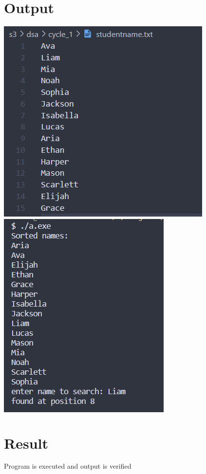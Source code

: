 \section{Output}
\includegraphics[]{Cycle_1/Outputs/BinarySearch2.png}
\includegraphics[]{Cycle_1/Outputs/BinarySearch1.png}

\section{Result}
Program is executed and output is verified